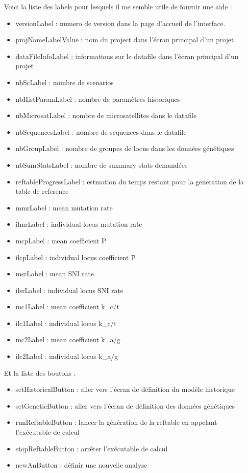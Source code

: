 \documentclass[12pt,a4paper]{article}
\begin{document}
    Voici la liste des labels pour lesquels il me semble utile de fournir une
    aide :\\

    \begin{itemize} 
        \item versionLabel : numero de version dans la page d'accueil de
            l'interface.
        \item projNameLabelValue : nom du project dans l'écran principal d'un projet
        \item dataFileInfoLabel : informations sur le datafile dans l'écran
            principal d'un projet
        \item nbScLabel : nombre de scenarios
        \item nbHistParamLabel : nombre de paramètres historiques
        \item nbMicrosatLabel : nombre de microsatellites dans le datafile
        \item nbSequencesLabel : nombre de sequences dans le datafile
        \item nbGroupLabel : nombre de groupes de locus dans les données
            génétiques
        \item nbSumStatsLabel : nombre de summary stats demandées
        \item reftableProgressLabel : estmation du temps restant pour la
            generation de la table de reference
        \item mmrLabel : mean mutation rate
        \item ilmrLabel : individual locus mutation rate
        \item mcpLabel : mean coefficient P
        \item ilcpLabel : individual locus coefficient P
        \item msrLabel : mean SNI rate
        \item ilsrLabel : individual locus SNI rate
        \item mc1Label : mean coefficient k\_c/t
        \item ilc1Label : individual locus k\_c/t
        \item mc2Label : mean coefficient k\_a/g
        \item ilc2Label : individual locus k\_a/g \\
    \end{itemize}

    Et la liste des boutons :

    \begin{itemize} 
        \item setHistoricalButton : aller vers l'écran de définition du modèle
            historique
        \item setGeneticButton : aller vers l'écran de définition des données
            génétiques
        \item runReftableButton : lancer la génération de la reftable en
            appelant l'exécutable de calcul
        \item stopReftableButton : arrêter l'exécutable de calcul
        \item newAnButton : définir une nouvelle analyse
    \end{itemize}
\end{document}
